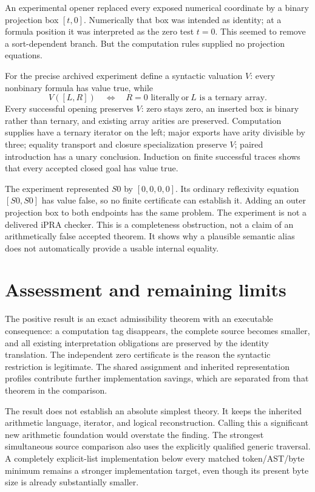 \documentclass[11pt,letterpaper]{article}
\theoremstyle{definition}\newtheorem{definition}[theorem]{Definition}
\theoremstyle{remark}\newtheorem{remark}[theorem]{Remark}
\begin{document}
An experimental opener replaced every exposed numerical coordinate by
a binary projection box $[t,0]$. Numerically that box was intended as
identity; at a formula position it was interpreted as the zero test
$t=0$. This seemed to remove a sort-dependent branch. But the computation
rules supplied no projection equations.

For the precise archived experiment define a syntactic valuation $V$:
every nonbinary formula has value true, while
\[
 V([L,R])\quad\Longleftrightarrow\quad
 R=0\text{ literally}\ \text{or}\ L\text{ is a ternary array}.
\]
Every successful opening preserves $V$: zero stays zero, an inserted
box is binary rather than ternary, and existing array arities are
preserved. Computation supplies have a ternary iterator on the left;
major exports have arity divisible by three; equality transport and
closure specialization preserve $V$; paired introduction has a unary
conclusion. Induction on finite successful traces shows that every
accepted closed goal has value true.

The experiment represented $S0$ by $[0,0,0,0]$. Its ordinary reflexivity
equation $[S0,S0]$ has value false, so no finite certificate can establish
it. Adding an outer projection box to both endpoints has the same
problem. The experiment is not a delivered iPRA checker. This is a
completeness obstruction, not a claim of an arithmetically false accepted
theorem. It shows why a plausible semantic alias does not automatically
provide a usable internal equality.



\section{Assessment and remaining limits}

The positive result is an exact admissibility theorem with an executable
consequence: a computation tag disappears, the complete source becomes
smaller, and all existing interpretation obligations are preserved by
the identity translation. The independent zero certificate is the
reason the syntactic restriction is legitimate. The shared assignment
and inherited representation profiles contribute further implementation
savings, which are separated from that theorem in the comparison.

The result does not establish an absolute simplest theory. It keeps the
inherited arithmetic language, iterator, and logical reconstruction.
Calling this a significant new arithmetic foundation would overstate
the finding. The strongest simultaneous source comparison also uses the
explicitly qualified generic traversal. A completely explicit-list
implementation below every matched token/AST/byte minimum remains a
stronger implementation target, even though its present byte size is
already substantially smaller.
\end{document}
